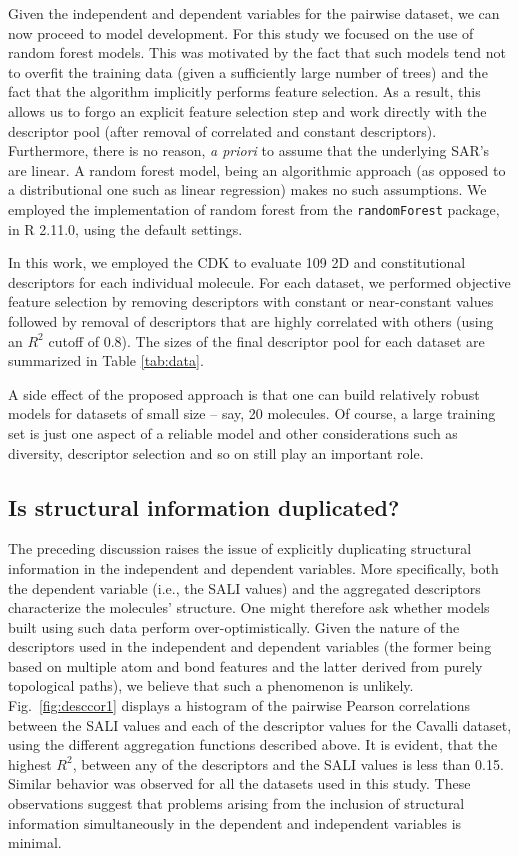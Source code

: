 \documentclass[letterpaper, 12pt]{article}
\begin{document}
Given the independent and dependent variables for the pairwise dataset, we can now proceed to model
development. For this study we focused on the use of random forest models\cite{Breiman:1984aa}. This
was motivated by the fact that such models tend not to overfit the training data (given a
sufficiently large number of trees) and the fact that the algorithm implicitly performs feature
selection. As a result, this allows us to forgo an explicit feature selection step and work directly
with the descriptor pool (after removal of correlated and constant descriptors). Furthermore, there
is no reason, \emph{a priori} to assume that the underlying SAR's are linear. A random forest model,
being an algorithmic approach\cite{Breiman:2001nx} (as opposed to a distributional one such as
linear regression) makes no such assumptions. We employed the implementation of random forest from
the \texttt{randomForest} package, in R 2.11.0\cite{r}, using the default settings.

In this work, we employed the CDK to evaluate 109 2D and constitutional descriptors for each
individual molecule. For each dataset, we performed objective feature selection by removing
descriptors with constant or near-constant values followed by removal of descriptors that are highly
correlated with others (using an $R^2$ cutoff of 0.8). The sizes of the final descriptor pool for
each dataset are summarized in Table \ref{tab:data}.

A side effect of the proposed approach is that one can build relatively robust models for datasets of
small size -- say, 20 molecules. Of course, a large training set is just one aspect of a reliable
model and other considerations such as diversity, descriptor selection and so on still play an
important role.

\subsection{Is structural information duplicated?}
\label{sec:are-we-duplicating}

The preceding discussion raises the issue of explicitly duplicating structural information in the
independent and dependent variables. More specifically, both the dependent variable (i.e., the SALI
values) and the aggregated descriptors characterize the molecules' structure. One might therefore
ask whether models built using such data perform over-optimistically. Given the nature of the
descriptors used in the independent and dependent variables (the former being based on multiple atom
and bond features and the latter derived from purely topological paths), we believe that such a
phenomenon is unlikely.  Fig.~\ref{fig:desccor1} displays a histogram of the pairwise Pearson
correlations between the SALI values and each of the descriptor values for the
Cavalli\cite{Cavalli:2002aa} dataset, using the different aggregation functions described above. It
is evident, that the highest $R^2$, between any of the descriptors and the SALI values is less than
0.15. Similar behavior was observed for all the datasets used in this study. These observations
suggest that problems arising from the inclusion of structural information simultaneously in the
dependent and independent variables is minimal.
\end{document}
